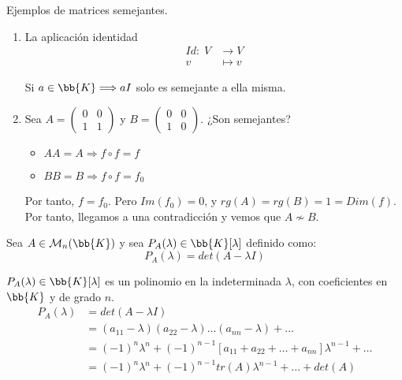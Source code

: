 \begin{ejemplo} Ejemplos de matrices semejantes.
    \begin{enumerate}
        \item La aplicación identidad
        \begin{align*}
            Id:\; V & \longrightarrow V \\
                v & \longmapsto v
        \end{align*}
        
        Si $a \in \bb{K} \Longrightarrow aI$ solo es semejante a ella misma.

        \item
        Sea $A = \left( \begin{array}{cc}
            0&0  \\
            1&1 
        \end{array}\right)$ y 
        $B = \left( \begin{array}{cc}
            0&0  \\
            1&0 
        \end{array}\right)$.
        ¿Son semejantes?

        \begin{itemize}
            \item $AA=A \Longrightarrow f \circ f = f$
            \item $BB=B \Longrightarrow f \circ f = f_0$
        \end{itemize}
        Por tanto, $f=f_0$. Pero $Im(f_0)={0}$, y $rg(A)=rg(B)=1=Dim(f)$. Por tanto, llegamos a una contradicción y vemos que $A\nsim B$.
    \end{enumerate}
\end{ejemplo}

\begin{definicion} Sea $A\in\mathcal{M}_n(\bb{K})$ y sea $P_A(\lambda) \in \bb{K}[\lambda] $  definido como:
    \begin{equation*}
        P_A(\lambda) = det(A-\lambda I)
    \end{equation*}

    $P_A(\lambda)\in \bb{K}[\lambda]$ es un polinomio en la indeterminada $\lambda$, con coeficientes en $\bb{K}$ y de grado $n$.
    \begin{equation*}\begin{split}
        P_A(\lambda) & = det(A-\lambda I) \\
        & = (a_{11}-\lambda)(a_{22}-\lambda)\dots(a_{nn}-\lambda) + \dots \\
        & = (-1)^n\lambda ^n + (-1)^{n-1}[a_{11} + a_{22} + \dots + a_{nn}]\lambda ^{n-1} + \dots\\
        & = (-1)^n\lambda ^n + (-1)^{n-1}tr(A)\lambda ^{n-1} + \dots + det(A)
    \end{split}\end{equation*}
\end{definicion}

